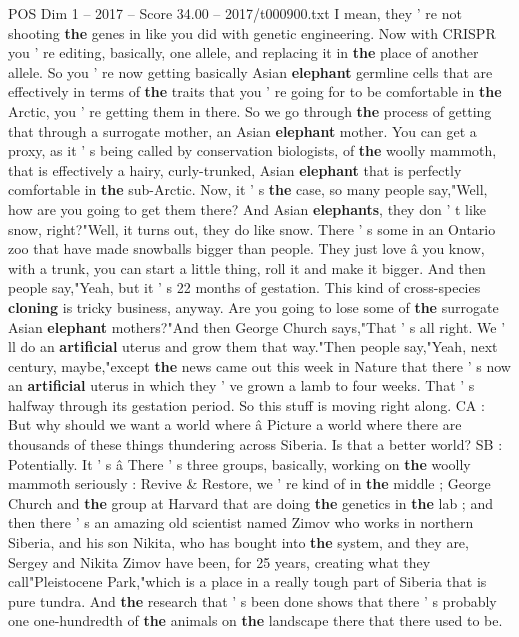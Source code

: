 \begin{textsample}{POS Dim 1 – 2017 – Score 34.00 – 2017/t000900.txt}
I mean, they ' re not shooting \textbf{the} genes in like you did with genetic engineering.
Now with CRISPR you ' re editing, basically, one allele, and replacing it in \textbf{the} place of another allele.
So you ' re now getting basically Asian \textbf{elephant} germline cells that are effectively in terms of \textbf{the} traits that you ' re going for to be comfortable in \textbf{the} Arctic, you ' re getting them in there.
So we go through \textbf{the} process of getting that through a surrogate mother, an Asian \textbf{elephant} mother.
You can get a proxy, as it ' s being called by conservation biologists, of \textbf{the} woolly mammoth, that is effectively a hairy, curly-trunked, Asian \textbf{elephant} that is perfectly comfortable in \textbf{the} sub-Arctic.
Now, it ' s \textbf{the} case, so many people say,"Well, how are you going to get them there?
And Asian \textbf{elephants}, they don ' t like snow, right?"Well, it turns out, they do like snow.
There ' s some in an Ontario zoo that have made snowballs bigger than people.
They just love â you know, with a trunk, you can start a little thing, roll it and make it bigger.
And then people say,"Yeah, but it ' s 22 months of gestation.
This kind of cross-species \textbf{cloning} is tricky business, anyway.
Are you going to lose some of \textbf{the} surrogate Asian \textbf{elephant} mothers?"And then George Church says,"That ' s all right.
We ' ll do an \textbf{artificial} uterus and grow them that way."Then people say,"Yeah, next century, maybe,"except \textbf{the} news came out this week in Nature that there ' s now an \textbf{artificial} uterus in which they ' ve grown a lamb to four weeks.
That ' s halfway through its gestation period.
So this stuff is moving right along.
CA : But why should we want a world where â Picture a world where there are thousands of these things thundering across Siberia.
Is that a better world?
SB : Potentially.
It ' s â There ' s three groups, basically, working on \textbf{the} woolly mammoth seriously : Revive \& Restore, we ' re kind of in \textbf{the} middle ; George Church and \textbf{the} group at Harvard that are doing \textbf{the} genetics in \textbf{the} lab ; and then there ' s an amazing old scientist named Zimov who works in northern Siberia, and his son Nikita, who has bought into \textbf{the} system, and they are, Sergey and Nikita Zimov have been, for 25 years, creating what they call"Pleistocene Park,"which is a place in a really tough part of Siberia that is pure tundra.
And \textbf{the} research that ' s been done shows that there ' s probably one one-hundredth of \textbf{the} animals on \textbf{the} landscape there that there used to be.

\end{textsample}
